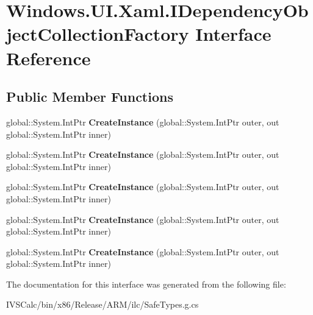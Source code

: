 \hypertarget{interface_windows_1_1_u_i_1_1_xaml_1_1_i_dependency_object_collection_factory}{}\section{Windows.\+U\+I.\+Xaml.\+I\+Dependency\+Object\+Collection\+Factory Interface Reference}
\label{interface_windows_1_1_u_i_1_1_xaml_1_1_i_dependency_object_collection_factory}
\subsection*{Public Member Functions}
\begin{DoxyCompactItemize}
\item 
\mbox{\label{interface_windows_1_1_u_i_1_1_xaml_1_1_i_dependency_object_collection_factory_a1269948b600fab190de1fa72e54b5283}} 
global\+::\+System.\+Int\+Ptr {\bfseries Create\+Instance} (global\+::\+System.\+Int\+Ptr outer, out global\+::\+System.\+Int\+Ptr inner)
\item 
\mbox{\label{interface_windows_1_1_u_i_1_1_xaml_1_1_i_dependency_object_collection_factory_a1269948b600fab190de1fa72e54b5283}} 
global\+::\+System.\+Int\+Ptr {\bfseries Create\+Instance} (global\+::\+System.\+Int\+Ptr outer, out global\+::\+System.\+Int\+Ptr inner)
\item 
\mbox{\label{interface_windows_1_1_u_i_1_1_xaml_1_1_i_dependency_object_collection_factory_a1269948b600fab190de1fa72e54b5283}} 
global\+::\+System.\+Int\+Ptr {\bfseries Create\+Instance} (global\+::\+System.\+Int\+Ptr outer, out global\+::\+System.\+Int\+Ptr inner)
\item 
\mbox{\label{interface_windows_1_1_u_i_1_1_xaml_1_1_i_dependency_object_collection_factory_a1269948b600fab190de1fa72e54b5283}} 
global\+::\+System.\+Int\+Ptr {\bfseries Create\+Instance} (global\+::\+System.\+Int\+Ptr outer, out global\+::\+System.\+Int\+Ptr inner)
\item 
\mbox{\label{interface_windows_1_1_u_i_1_1_xaml_1_1_i_dependency_object_collection_factory_a1269948b600fab190de1fa72e54b5283}} 
global\+::\+System.\+Int\+Ptr {\bfseries Create\+Instance} (global\+::\+System.\+Int\+Ptr outer, out global\+::\+System.\+Int\+Ptr inner)
\end{DoxyCompactItemize}


The documentation for this interface was generated from the following file\+:\begin{DoxyCompactItemize}
\item 
I\+V\+S\+Calc/bin/x86/\+Release/\+A\+R\+M/ilc/Safe\+Types.\+g.\+cs\end{DoxyCompactItemize}
